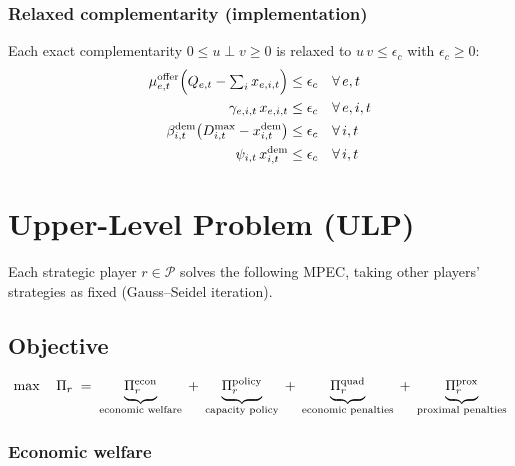 \documentclass[11pt]{article}
\newcommand{\PP}{\mathcal{P}}
\begin{document}
\subsubsection*{Relaxed complementarity (implementation)}

Each exact complementarity $0 \le u \perp v \ge 0$ is relaxed to
$u\,v \le \epsilon_c$ with $\epsilon_c \ge 0$:
\begin{align}
  \mu^{\mathrm{offer}}_{e,t}
    \Bigl(Q_{e,t}-\textstyle\sum_{i}x_{e,i,t}\Bigr)
    &\le \epsilon_c
    && \forall\,e,t \\
  \gamma_{e,i,t}\,x_{e,i,t}
    &\le \epsilon_c
    && \forall\,e,i,t \\
  \beta^{\mathrm{dem}}_{i,t}
    \bigl(D^{\max}_{i,t}-x^{\mathrm{dem}}_{i,t}\bigr)
    &\le \epsilon_c
    && \forall\,i,t \\
  \psi_{i,t}\,x^{\mathrm{dem}}_{i,t}
    &\le \epsilon_c
    && \forall\,i,t
\end{align}

\section{Upper-Level Problem (ULP)}

Each strategic player $r\in\PP$ solves the following MPEC, taking
other players' strategies as fixed (Gauss--Seidel iteration).

\subsection{Objective}

\begin{equation}\label{eq:ulp-obj}
  \max \quad \Pi_r
  \;=\;
  \underbrace{\Pi^{\mathrm{econ}}_r\vphantom{\big|}}_{\text{economic welfare}}
  \;+\;
  \underbrace{\Pi^{\mathrm{policy}}_r\vphantom{\big|}}_{\text{capacity policy}}
  \;+\;
  \underbrace{\Pi^{\mathrm{quad}}_r\vphantom{\big|}}_{\text{economic penalties}}
  \;+\;
  \underbrace{\Pi^{\mathrm{prox}}_r\vphantom{\big|}}_{\text{proximal penalties}}
\end{equation}

\subsubsection*{Economic welfare}
\end{document}
